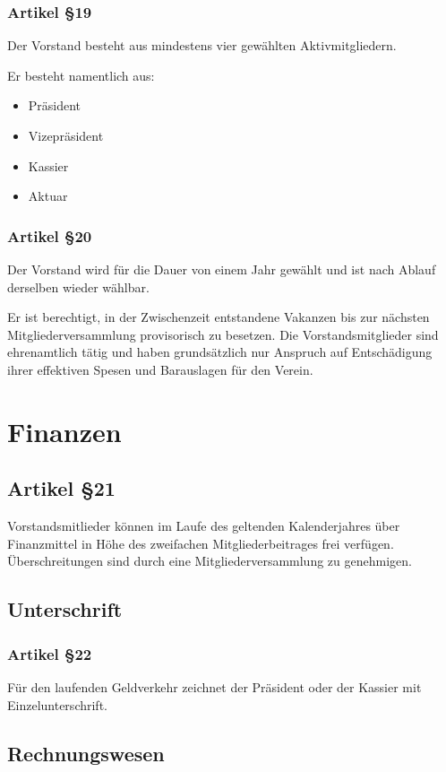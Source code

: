 \documentclass[a4paper,
               10pt,
               fleqn]{article}
\begin{document}
\subsubsection*{Artikel §19}
Der Vorstand besteht aus mindestens vier gewählten 
Aktivmitgliedern.

Er besteht namentlich aus:
\begin{itemize}
\item Präsident
\item Vizepräsident
\item Kassier
\item Aktuar
\end{itemize}
 
\subsubsection*{Artikel §20}
Der Vorstand wird für die Dauer von einem Jahr gewählt und 
ist nach Ablauf derselben wieder wählbar.

Er ist berechtigt, in der Zwischenzeit entstandene Vakanzen 
bis zur nächsten Mitgliederversammlung provisorisch zu
besetzen. Die Vorstandsmitglieder sind ehrenamtlich tätig
und haben grundsätzlich nur Anspruch auf Entschädigung ihrer
effektiven Spesen und Barauslagen für den Verein.

\section{Finanzen}

\subsection*{Artikel §21}
Vorstandsmitlieder können im Laufe des geltenden 
Kalenderjahres über Finanzmittel in Höhe des zweifachen
Mitgliederbeitrages frei verfügen. Überschreitungen sind
durch eine Mitgliederversammlung zu genehmigen.

\subsection{Unterschrift}

\subsubsection*{Artikel §22}
Für den laufenden Geldverkehr zeichnet der Präsident oder 
der Kassier mit Einzelunterschrift.

\subsection{Rechnungswesen}
\end{document}

